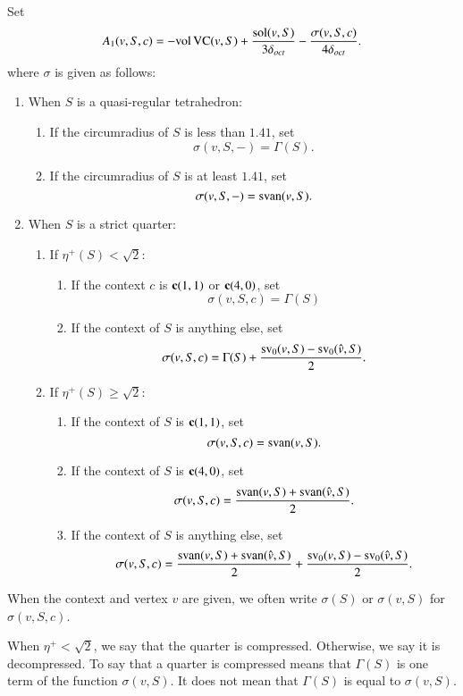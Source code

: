 \begin{definition}[$A_1$,~$\sigma$]\label{def:sigma}
Set
   \begin{equation}\label{eqn:a1-sigma}
   A_1(v,S,c) = -{\operatorname{vol}}\,{\operatorname{VC}}(v,S)+
      \frac{\operatorname{sol}(v,S)}{3\delta_{oct}} - \frac{\sigma(v,S,c)}{4\delta_{oct}}.
      \end{equation}  where $\sigma$ is given as follows:
\begin{enumerate}
\item When $S$ is a quasi-regular tetrahedron:
   \begin{enumerate}
      \item If the circumradius of $S$ is less than $1.41$, set
         $$\sigma(v,S,-)=\Gamma(S).$$
      \item If the circumradius of $S$ is at least $1.41$, set
         $$\sigma(v,S,-)={\operatorname{svan}}(v,S).$$
   \end{enumerate}
\item When $S$ is a strict quarter:
   \begin{enumerate}
      \item If $\eta^+(S) <\sqrt2$:
         \begin{enumerate}
         \item If the context $c$ is ${\operatorname{\bf c}}{(1,1)}$ or ${\operatorname{\bf c}}{(4,0)}$, set
                  $$\sigma(v,S,c)=\Gamma(S)$$
         \item If the context of $S$ is anything else, set
                  $$\sigma(v,S,c)=\Gamma(S) +
                     \frac{{\operatorname{sv}}_0(v,S)
                      -{\operatorname{sv}}_0(\hat v,S)}{2}.$$
         \end{enumerate}
      \item If $\eta^+(S) \ge\sqrt2$:
         \begin{enumerate}
         \item If the context of $S$ is ${\operatorname{\bf c}}{(1,1)}$, set
                  $$\sigma(v,S,c)={\operatorname{svan}}(v,S).$$
         \item If the context of $S$ is ${\operatorname{\bf c}}{(4,0)}$, set
                  $$\sigma(v,S,c)=\frac{{\operatorname{svan}}(v,S)
            +{\operatorname{svan}}(\hat v,S)}{2}.$$
         \item If the context of $S$ is anything else, set
                  $$\sigma(v,S,c)=\frac{{\operatorname{svan}}(v,S)
           +{\operatorname{svan}}(\hat v,S)
                  }{2}
                     +\frac{{\operatorname{sv}}_0(v,S)-
                     {\operatorname{sv}}_0(\hat v,S)}{2}.$$
         \end{enumerate}
   \end{enumerate}
\end{enumerate}
When the context and vertex $v$ are given, we often write
$\sigma(S)$ or $\sigma(v,S)$ for $\sigma(v,S,c)$.

When $\eta^+<\sqrt2$, we say that the quarter is compressed.
Otherwise, we say it is decompressed.  To say that a quarter is
compressed means that $\Gamma(S)$ is one term of the function
$\sigma(v,S)$. It does not mean that $\Gamma(S)$ is equal to
$\sigma(v,S)$.
%
\end{definition}

